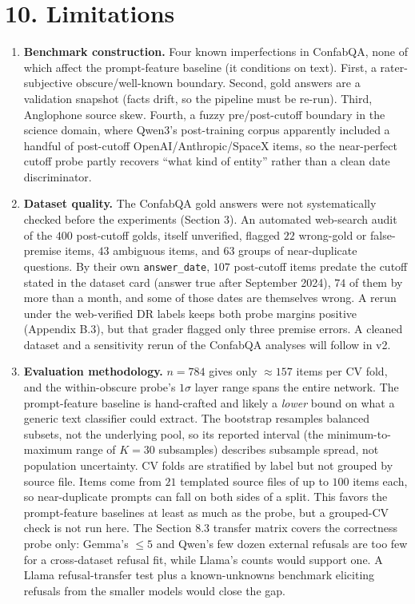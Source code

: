 \section{10. Limitations}\label{limitations}

\begin{enumerate}
\def\labelenumi{\arabic{enumi}.}
\item
  \textbf{Benchmark construction.} Four known imperfections in ConfabQA, none of which affect the prompt-feature baseline (it conditions on text). First, a rater-subjective obscure/well-known boundary. Second, gold answers are a validation snapshot (facts drift, so the pipeline must be re-run). Third, Anglophone source skew. Fourth, a fuzzy pre/post-cutoff boundary in the science domain, where Qwen3's post-training corpus apparently included a handful of post-cutoff OpenAI/Anthropic/SpaceX items, so the near-perfect cutoff probe partly recovers ``what kind of entity'' rather than a clean date discriminator.
\item
  \textbf{Dataset quality.} The ConfabQA gold answers were not systematically checked before the experiments (Section 3). An automated web-search audit of the \(400\) post-cutoff golds, itself unverified, flagged \(22\) wrong-gold or false-premise items, \(43\) ambiguous items, and \(63\) groups of near-duplicate questions. By their own \texttt{answer\_date}, \(107\) post-cutoff items predate the cutoff stated in the dataset card (answer true after September 2024), \(74\) of them by more than a month, and some of those dates are themselves wrong. A rerun under the web-verified DR labels keeps both probe margins positive (Appendix B.3), but that grader flagged only three premise errors. A cleaned dataset and a sensitivity rerun of the ConfabQA analyses will follow in v2.
\item
  \textbf{Evaluation methodology.} \(n = 784\) gives only \(\approx 157\) items per CV fold, and the within-obscure probe's \(1\sigma\) layer range spans the entire network. The prompt-feature baseline is hand-crafted and likely a \emph{lower} bound on what a generic text classifier could extract. The bootstrap resamples balanced subsets, not the underlying pool, so its reported interval (the minimum-to-maximum range of \(K=30\) subsamples) describes subsample spread, not population uncertainty. CV folds are stratified by label but not grouped by source file. Items come from \(21\) templated source files of up to \(100\) items each, so near-duplicate prompts can fall on both sides of a split. This favors the prompt-feature baselines at least as much as the probe, but a grouped-CV check is not run here. The Section 8.3 transfer matrix covers the correctness probe only: Gemma's \(\le 5\) and Qwen's few dozen external refusals are too few for a cross-dataset refusal fit, while Llama's counts would support one. A Llama refusal-transfer test plus a known-unknowns benchmark eliciting refusals from the smaller models would close the gap.

\end{enumerate}
